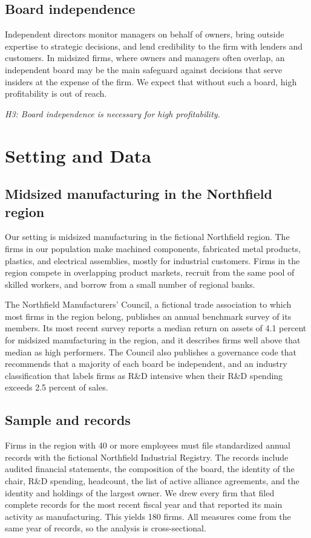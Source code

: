 \documentclass[11pt]{article}
\begin{document}
\subsection{Board independence}

Independent directors monitor managers on behalf of owners, bring outside expertise to strategic decisions, and lend credibility to the firm with lenders and customers. In midsized firms, where owners and managers often overlap, an independent board may be the main safeguard against decisions that serve insiders at the expense of the firm. We expect that without such a board, high profitability is out of reach.

\medskip
\noindent\emph{H3: Board independence is necessary for high profitability.}
\medskip

\clearpage
\section{Setting and Data}

\subsection{Midsized manufacturing in the Northfield region}

Our setting is midsized manufacturing in the fictional Northfield region. The firms in our population make machined components, fabricated metal products, plastics, and electrical assemblies, mostly for industrial customers. Firms in the region compete in overlapping product markets, recruit from the same pool of skilled workers, and borrow from a small number of regional banks.

The Northfield Manufacturers' Council, a fictional trade association to which most firms in the region belong, publishes an annual benchmark survey of its members. Its most recent survey reports a median return on assets of 4.1 percent for midsized manufacturing in the region, and it describes firms well above that median as high performers. The Council also publishes a governance code that recommends that a majority of each board be independent, and an industry classification that labels firms as R\&D intensive when their R\&D spending exceeds 2.5 percent of sales.

\subsection{Sample and records}

Firms in the region with 40 or more employees must file standardized annual records with the fictional Northfield Industrial Registry. The records include audited financial statements, the composition of the board, the identity of the chair, R\&D spending, headcount, the list of active alliance agreements, and the identity and holdings of the largest owner. We drew every firm that filed complete records for the most recent fiscal year and that reported its main activity as manufacturing. This yields 180 firms. All measures come from the same year of records, so the analysis is cross-sectional.
\end{document}
